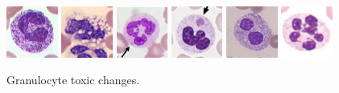 \documentclass[final,a4paper,12pt,english]{UnicaPhdThesis3}
\begin{document}
\begin{figure}[!htbp]
\centering
\includegraphics[width=0.15\textwidth]{images/granul}
\includegraphics[width=0.15\textwidth]{images/vacuol}
\includegraphics[width=0.15\textwidth]{images/Dohle}
\includegraphics[width=0.15\textwidth]{images/Auer}
\includegraphics[width=0.15\textwidth]{images/Pelger}
\includegraphics[width=0.15\textwidth]{images/hyper}
\caption{\label{fig:Changes} Granulocyte toxic changes.}
\end{figure}
\end{document}
